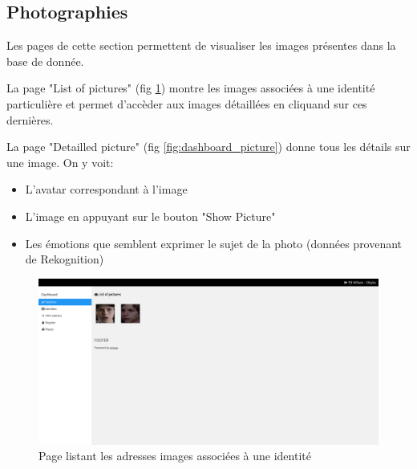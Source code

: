 \subsection{Photographies}
Les pages de cette section permettent de visualiser les images présentes dans la base de donnée.

La page "List of pictures" (fig \ref{fig:dashboard_list_pictures}) montre les images associées à une identité particulière et 
permet d'accèder aux images détaillées en cliquand sur ces dernières.

La page "Detailled picture" (fig \ref{fig:dashboard_picture}) donne tous les détails sur une image. On y voit:
\begin{itemize}
    \item L'avatar correspondant à l'image
    \item L'image en appuyant sur le bouton "Show Picture"
    \item Les émotions que semblent exprimer le sujet de la photo (données provenant de Rekognition)
\end{itemize}

\clearpage
\newpage
\thispagestyle{empty}
\begin{landscape}
    \centering
\thispagestyle{empty}
\begin{figure}[h]
	\includegraphics[width=\linewidth]{images/dashboard/pictures.png}
	\caption{Page listant les adresses images associées à une identité}
	\label{fig:dashboard_list_pictures}
\end{figure}
\end{landscape}

